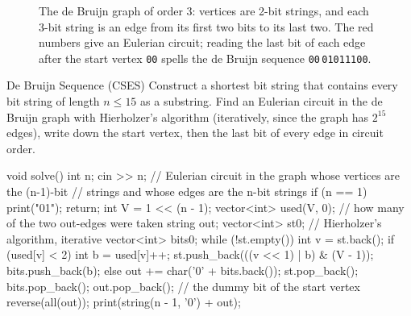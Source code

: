 \begin{figure}[htbp]
\centering
{}
\caption{The de Bruijn graph of order 3: vertices are 2-bit strings, and each 3-bit string is an edge from its first two bits
to its last two. The red numbers give an Eulerian circuit; reading the last bit of each edge after the start vertex
\texttt{00} spells the de Bruijn sequence \texttt{00}\,\texttt{01011100}.}
\label{fig:debruijn}
\end{figure}

\begin{problem}{De Bruijn Sequence (CSES)}
Construct a shortest bit string that contains every bit string of length $n \le 15$ as a substring.
\solution Find an Eulerian circuit in the de Bruijn graph with Hierholzer's algorithm (iteratively, since the graph has
$2^{15}$ edges), write down the start vertex, then the last bit of every edge in circuit order.
\end{problem}

\begin{code}
void solve() {
    int n;
    cin >> n;
    // Eulerian circuit in the graph whose vertices are the (n-1)-bit
    // strings and whose edges are the n-bit strings
    if (n == 1) {
        print("01");
        return;
    }
    int V = 1 << (n - 1);
    vector<int> used(V, 0);  // how many of the two out-edges were taken
    string out;
    vector<int> st{0};  // Hierholzer's algorithm, iterative
    vector<int> bits{0};
    while (!st.empty()) {
        int v = st.back();
        if (used[v] < 2) {
            int b = used[v]++;
            st.push_back(((v << 1) | b) & (V - 1));
            bits.push_back(b);
        } else {
            out += char('0' + bits.back());
            st.pop_back();
            bits.pop_back();
        }
    }
    out.pop_back();  // the dummy bit of the start vertex
    reverse(all(out));
    print(string(n - 1, '0') + out);
}
\end{code}

